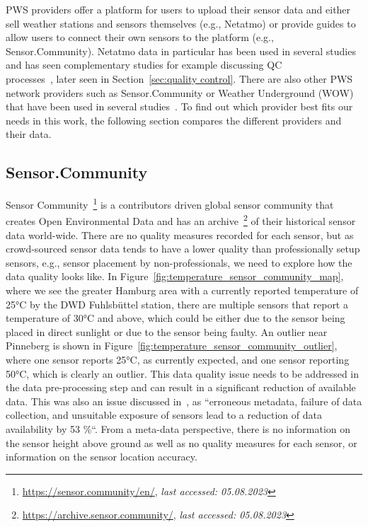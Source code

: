 PWS providers offer a platform for users to upload their sensor data and either sell weather stations and sensors themselves (e.g., Netatmo) or provide guides to allow users to connect their own sensors to the platform (e.g., Sensor.Community). Netatmo data in particular has been used in several studies~\cite{meier2017crowdsourcing, hahn2022observations, venter2020hyperlocal, zumwald2021mapping} and has seen complementary studies for example discussing QC\\
processes~\cite{fenner2021crowdqc+}, later seen in Section~\ref{sec:quality control}. There are also other PWS network providers such as Sensor.Community or Weather Underground (WOW) that have been used in several studies~\cite{ho2014mapping}. To find out which provider best fits our needs in this work, the following section compares the different providers and their data.

\subsection{Sensor.Community}

Sensor Community~\footnote{\url{https://sensor.community/en/}, \textit{last accessed: 05.08.2023}} is a contributors driven global sensor community that creates Open Environmental Data and has an archive~\footnote{\url{https://archive.sensor.community/}, \textit{last accessed: 05.08.2023}} of their historical sensor data world-wide. There are no quality measures recorded for each sensor, but as crowd-sourced sensor data tends to have a lower quality than professionally setup sensors, e.g., sensor placement by non-professionals, we need to explore how the data quality looks like.
In Figure~\ref{fig:temperature_sensor_community_map}, where we see the greater Hamburg area with a currently reported temperature of 25°C by the DWD Fuhlsbüttel station, there are multiple sensors that report a temperature of 30°C and above, which could be either due to the sensor being placed in direct sunlight or due to the sensor being faulty. An outlier near Pinneberg is shown in Figure~\ref{fig:temperature_sensor_community_outlier}, where one sensor reports 25°C, as currently expected, and one sensor reporting 50°C, which is clearly an outlier. This data quality issue needs to be addressed in the data pre-processing step and can result in a significant reduction of available data. This was also an issue discussed in~\cite{meier2017crowdsourcing}, as ``erroneous metadata, failure of data collection, and unsuitable exposure of sensors lead to a reduction of data availability by 53 \%``.
From a meta-data perspective, there is no information on the sensor height above ground as well as no quality measures for each sensor, or information on the sensor location accuracy.

